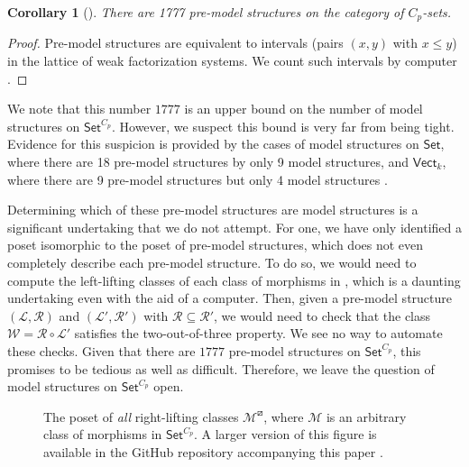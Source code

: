 \documentclass{amsart}
\newcommand{\computerassisted}{\faLaptopCode}
\newcommand{\Set}{\mathsf{Set}}
\newcommand{\CpSet}{\Set^{C_p}}
\numberwithin{equation}{section}
\newtheorem{corollary}[equation]{Corollary}
\theoremstyle{definition}
\begin{document}
\begin{corollary}[\computerassisted]
	\label{cor:final count}
	There are 1777 pre-model structures on the category of $C_p$-sets.
\end{corollary}

\begin{proof}
	Pre-model structures are equivalent to intervals (pairs $(x,y)$ with $x \leq y$) in the lattice of weak factorization systems. We count such intervals by computer \cite{code}.
\end{proof}

We note that this number $1777$ is an upper bound on the number of model structures on $\CpSet$. However, we suspect this bound is very far from being tight. Evidence for this suspicion is provided by the cases of model structures on $\Set$, where there are 18 pre-model structures by only 9 model structures, and $\textsf{Vect}_k$, where there are 9 pre-model structures but only 4 model structures \cite{ACB2025}.

Determining which of these pre-model structures are model structures is a significant undertaking that we do not attempt. For one, we have only identified a poset isomorphic to the poset of pre-model structures, which does not even completely describe each pre-model structure. To do so, we would need to compute the left-lifting classes of each class of morphisms in , which is a daunting undertaking even with the aid of a computer. Then, given a pre-model structure $(\mathcal L, \mathcal R)$ and $(\mathcal L', \mathcal R')$ with $\mathcal R \subseteq \mathcal R'$, we would need to check that the class $\mathcal W = \mathcal R \circ \mathcal L'$ satisfies the two-out-of-three property. We see no way to automate these checks. Given that there are $1777$ pre-model structures on $\CpSet$, this promises to be tedious as well as difficult. Therefore, we leave the question of model structures on $\CpSet$ open. 

\begin{figure}
	\centering
	\vspace*{10cm}
	\caption{The poset of \emph{all} right-lifting classes $\mathcal{M}^\boxslash$, where $\mathcal{M}$ is an arbitrary class of morphisms in $\CpSet$. A larger version of this figure is available in the GitHub repository accompanying this paper \cite{code}.}
	\label{fig:biggest lattice}
\end{figure}
\end{document}

